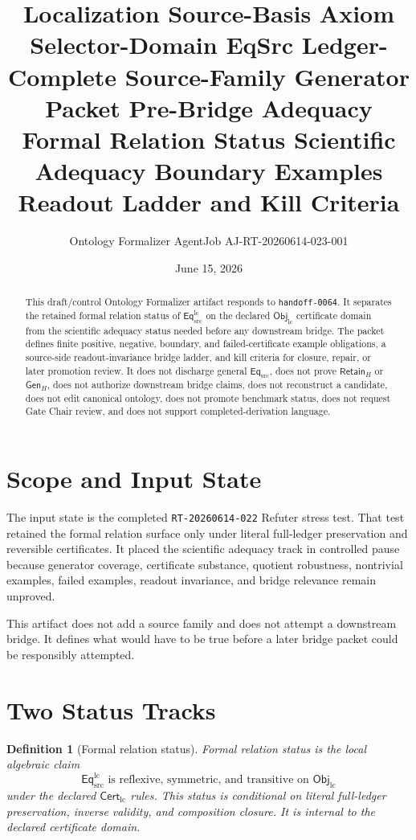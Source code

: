 \documentclass[11pt]{article}
\title{\textbf{Localization Source-Basis Axiom Selector-Domain EqSrc Ledger-Complete Source-Family Generator Packet Pre-Bridge Adequacy}\\[0.35em]
\large Formal Relation Status Scientific Adequacy Boundary Examples Readout Ladder and Kill Criteria}
\author{Ontology Formalizer AgentJob AJ-RT-20260614-023-001}
\date{June 15, 2026}
\newcommand{\EqSrc}{\mathsf{Eq}_{\mathrm{src}}}
\newcommand{\EqLC}{\mathsf{Eq}_{\mathrm{src}}^{\mathrm{lc}}}
\newcommand{\ObjLC}{\mathsf{Obj}_{\mathrm{lc}}}
\newcommand{\CertLC}{\mathsf{Cert}_{\mathrm{lc}}}
\newcommand{\RetainH}{\mathsf{Retain}_{H}}
\newcommand{\GenH}{\mathsf{Gen}_{H}}
\newtheorem{definition}{Definition}
\begin{document}
\maketitle

\begin{abstract}
This draft/control Ontology Formalizer artifact responds to
\texttt{handoff-0064}. It separates the retained formal relation status
of \(\EqLC\) on the declared \(\ObjLC\) certificate domain from the
scientific adequacy status needed before any downstream bridge. The
packet defines finite positive, negative, boundary, and
failed-certificate example obligations, a source-side readout-invariance
bridge ladder, and kill criteria for closure, repair, or later
promotion review. It does not discharge general \(\EqSrc\), does not
prove \(\RetainH\) or \(\GenH\), does not authorize downstream bridge
claims, does not reconstruct a candidate, does not edit canonical
ontology, does not promote benchmark status, does not request Gate Chair
review, and does not support completed-derivation language.
\end{abstract}

\section{Scope and Input State}

The input state is the completed \texttt{RT-20260614-022} Refuter stress
test. That test retained the formal relation surface only under literal
full-ledger preservation and reversible certificates. It placed the
scientific adequacy track in controlled pause because generator
coverage, certificate substance, quotient robustness, nontrivial
examples, failed examples, readout invariance, and bridge relevance
remain unproved.

This artifact does not add a source family and does not attempt a
downstream bridge. It defines what would have to be true before a later
bridge packet could be responsibly attempted.

\section{Two Status Tracks}

\begin{definition}[Formal relation status]
Formal relation status is the local algebraic claim
\[
    \EqLC \text{ is reflexive, symmetric, and transitive on } \ObjLC
\]
under the declared \(\CertLC\) rules. This status is conditional on
literal full-ledger preservation, inverse validity, and composition
closure. It is internal to the declared certificate domain.
\end{definition}
\end{document}
